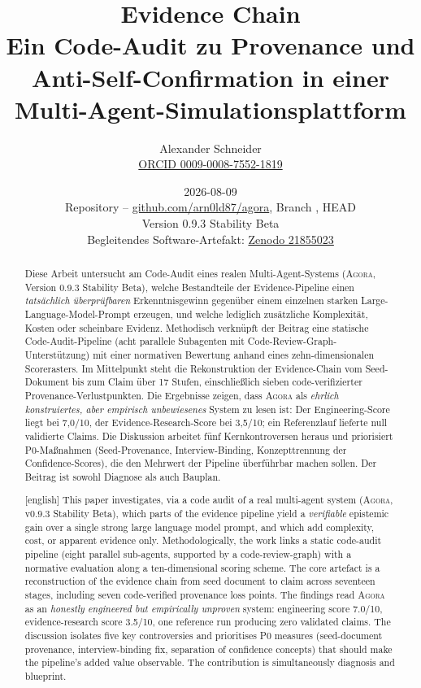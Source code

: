 \documentclass[11pt,a4paper,oneside,open=any,parskip=half-]{scrreprt}
\title{\agora{} Evidence Chain\\\large Ein Code-Audit zu Provenance und Anti-Self-Confirmation in einer Multi-Agent-Simulationsplattform}
\author{Alexander Schneider\\
\small \href{https://orcid.org/0009-0008-7552-1819}{ORCID 0009-0008-7552-1819}}
\date{2026-08-09 \\
\small Repository \code{arn0ld87/agora} -- \href{https://github.com/arn0ld87/agora}{github.com/arn0ld87/agora}, Branch \code{feat/1152-provenance-retrieval}, HEAD \code{7e42ae34} \\
\small Version 0.9.3 Stability Beta \\
\small Begleitendes Software-Artefakt: \href{https://zenodo.org/records/21855023}{Zenodo 21855023}}
\newcommand{\agora}{\textsc{Agora}}
\begin{document}
\maketitle
\thispagestyle{empty}

\begin{abstract}
\noindent
Diese Arbeit untersucht am Code-Audit eines realen Multi-Agent-Systems (\agora{}, Version 0.9.3 Stability Beta), welche Bestandteile der Evidence-Pipeline einen \emph{tats{\"a}chlich {\"u}berpr{\"u}fbaren} Erkenntnisgewinn gegen{\"u}ber einem einzelnen starken Large-Language-Model-Prompt erzeugen, und welche lediglich zus{\"a}tzliche Komplexit{\"a}t, Kosten oder scheinbare Evidenz. Methodisch verkn{\"u}pft der Beitrag eine statische Code-Audit-Pipeline (acht parallele Subagenten mit Code-Review-Graph-Unterst{\"u}tzung) mit einer normativen Bewertung anhand eines zehn-dimensionalen Scorerasters. Im Mittelpunkt steht die Rekonstruktion der Evidence-Chain vom Seed-Dokument bis zum Claim {\"u}ber 17 Stufen, einschließlich sieben code-verifizierter Provenance-Verlustpunkten. Die Ergebnisse zeigen, dass \agora{} als \emph{ehrlich konstruiertes, aber empirisch unbewiesenes} System zu lesen ist: Der Engineering-Score liegt bei 7,0/10, der Evidence-Research-Score bei 3,5/10; ein Referenzlauf lieferte null validierte Claims. Die Diskussion arbeitet f{\"u}nf Kernkontroversen heraus und priorisiert P0-Maßnahmen (Seed-Provenance, Interview-Binding, Konzepttrennung der Confidence-Scores), die den Mehrwert der Pipeline {\"u}berf{\"u}hrbar machen sollen. Der Beitrag ist sowohl Diagnose als auch Bauplan.
\end{abstract}

\begin{abstract}[english]
\noindent
This paper investigates, via a code audit of a real multi-agent system (\agora{}, v0.9.3 Stability Beta), which parts of the evidence pipeline yield a \emph{verifiable} epistemic gain over a single strong large language model prompt, and which add complexity, cost, or apparent evidence only. Methodologically, the work links a static code-audit pipeline (eight parallel sub-agents, supported by a code-review-graph) with a normative evaluation along a ten-dimensional scoring scheme. The core artefact is a reconstruction of the evidence chain from seed document to claim across seventeen stages, including seven code-verified provenance loss points. The findings read \agora{} as an \emph{honestly engineered but empirically unproven} system: engineering score 7.0/10, evidence-research score 3.5/10, one reference run producing zero validated claims. The discussion isolates five key controversies and prioritises P0 measures (seed-document provenance, interview-binding fix, separation of confidence concepts) that should make the pipeline's added value observable. The contribution is simultaneously diagnosis and blueprint.
\end{abstract}
\end{document}
